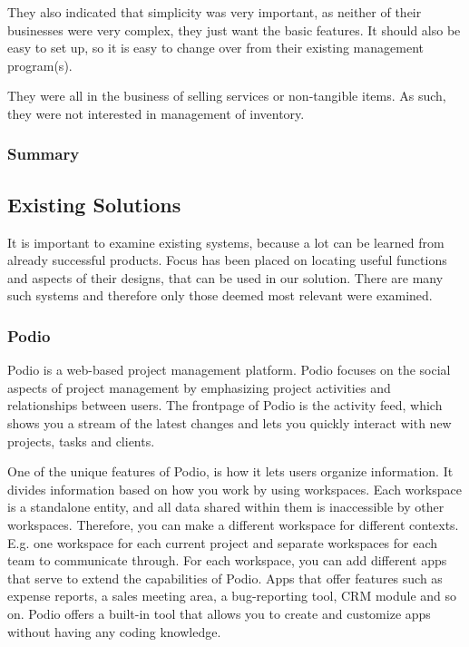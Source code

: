 They also indicated that simplicity was very important, as neither of their businesses were very complex, they just want the basic features. It should also be easy to set up, so it is easy to change over from their existing management program(s).

They were all in the business of selling services or non-tangible items. As such, they were not interested in management of inventory.

\subsubsection{Summary}

\subsection{Existing Solutions}
It is important to examine existing systems, because a lot can be learned from already successful products.
Focus has been placed on locating useful functions and aspects of their designs, that can be used in our solution. There are many such systems and therefore only those deemed most relevant were examined. 

\subsubsection{Podio}
Podio is a web-based project management platform\citep{website:podio}. Podio focuses on the social aspects of project management by emphasizing project activities and relationships between users. The frontpage of Podio is the activity feed, which shows you a stream of the latest changes and lets you quickly interact with new projects, tasks and clients.

One of the unique features of Podio, is how it lets users organize information. It divides information based on how you work by using workspaces. Each workspace is a standalone entity, and all data shared within them is inaccessible by other workspaces. Therefore, you can make a different workspace for different contexts. E.g. one workspace for each current project and separate workspaces for each team to communicate through. For each workspace, you can add different apps that serve to extend the capabilities of Podio. Apps that offer features such as expense reports, a sales meeting area, a bug-reporting tool, CRM module and so on. 
Podio offers a built-in tool that allows you to create and customize apps without having any coding knowledge. 

